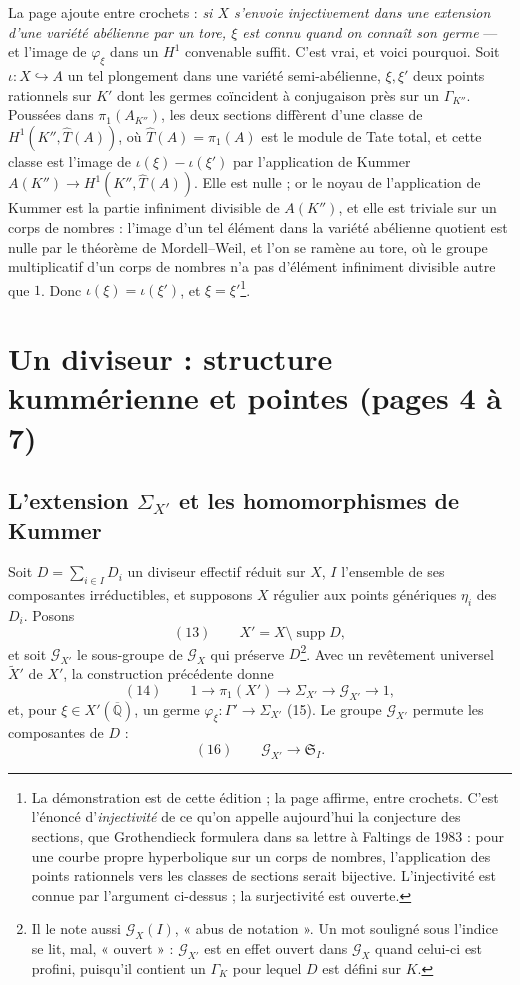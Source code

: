 \documentclass[11pt,a4paper]{article}
\begin{document}
La page ajoute entre crochets : \emph{si $X$ s'envoie injectivement dans une
extension d'une variété abélienne par un tore, $\xi$ est connu quand on connaît
son germe} — et l'image de $\varphi_\xi$ dans un $H^1$ convenable suffit. C'est
vrai, et voici pourquoi. Soit $\iota : X \hookrightarrow A$ un tel plongement
dans une variété semi-abélienne, $\xi, \xi'$ deux points rationnels sur $K'$
dont les germes coïncident à conjugaison près sur un $\Gamma_{K''}$. Poussées
dans $\pi_1(A_{K''})$, les deux sections diffèrent d'une classe de
$H^1(K'', \widehat{T}(A))$, où $\widehat{T}(A) = \pi_1(A)$ est le module de
Tate total, et cette classe est l'image de $\iota(\xi) - \iota(\xi')$ par
l'application de Kummer $A(K'') \to H^1(K'', \widehat{T}(A))$. Elle est
nulle ; or le noyau de l'application de Kummer est la partie infiniment
divisible de $A(K'')$, et elle est triviale sur un corps de nombres : l'image
d'un tel élément dans la variété abélienne quotient est nulle par le théorème
de Mordell--Weil, et l'on se ramène au tore, où le groupe multiplicatif d'un
corps de nombres n'a pas d'élément infiniment divisible autre que $1$. Donc
$\iota(\xi) = \iota(\xi')$, et $\xi = \xi'$\footnote{La démonstration est de
cette édition ; la page affirme, entre crochets. C'est l'énoncé
d'\emph{injectivité} de ce qu'on appelle aujourd'hui la conjecture des
sections, que Grothendieck formulera dans sa lettre à Faltings de 1983 : pour
une courbe propre hyperbolique sur un corps de nombres, l'application des points
rationnels vers les classes de sections serait bijective. L'injectivité est
connue par l'argument ci-dessus ; la surjectivité est ouverte.}.

\section*{Un diviseur : structure kummérienne et pointes (pages 4 à 7)}

\subsection*{L'extension $\Sigma_{X'}$ et les homomorphismes de Kummer}

Soit $D = \sum_{i \in I} D_i$ un diviseur effectif réduit sur $X$, $I$
l'ensemble de ses composantes irréductibles, et supposons $X$ régulier aux
points génériques $\eta_i$ des $D_i$. Posons
\[
(13)\qquad X' = X \setminus \operatorname{supp} D,
\]
et soit $\mathcal{G}_{X'}$ le sous-groupe de $\mathcal{G}_X$ qui préserve
$D$\footnote{Il le note aussi $\mathcal{G}_X(I)$, « abus de notation ». Un
mot souligné sous l'indice se lit, mal, « ouvert » : $\mathcal{G}_{X'}$ est
en effet ouvert dans $\mathcal{G}_X$ quand celui-ci est profini, puisqu'il
contient un $\Gamma_{K}$ pour lequel $D$ est défini sur $K$.}. Avec un
revêtement universel $\widetilde X'$ de $X'$, la construction précédente donne
\[
(14)\qquad 1 \longrightarrow \pi_1(X') \longrightarrow \Sigma_{X'}
\longrightarrow \mathcal{G}_{X'} \longrightarrow 1,
\]
et, pour $\xi \in X'(\overline{\mathbb{Q}})$, un germe $\varphi_\xi : \Gamma'
\to \Sigma_{X'}$ (15). Le groupe $\mathcal{G}_{X'}$ permute les composantes de
$D$ :
\[
(16)\qquad \mathcal{G}_{X'} \longrightarrow \mathfrak{S}_I .
\]
\end{document}
